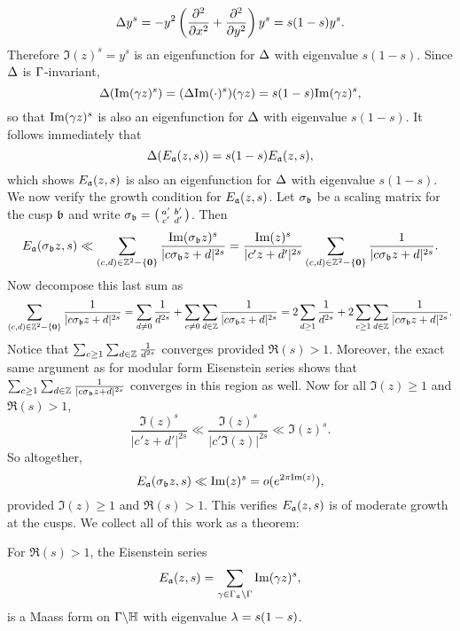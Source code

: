       \[
        \Delta y^{s} = -y^{2}\left(\frac{\partial^{2}}{\partial x^{2}}+\frac{\partial^{2}}{\partial y^{2}}\right)y^{s} = s(1-s)y^{s}.
      \]
      Therefore $\Im(z)^{s} = y^{s}$ is an eigenfunction for $\Delta$ with eigenvalue $s(1-s)$. Since $\Delta$ is $\Gamma$-invariant,
      \[
        \Delta(\mathrm{Im}(\gamma z)^{s}) = (\Delta\mathrm{Im}(\cdot)^{s})(\gamma z) = s(1-s)\mathrm{Im}(\gamma z)^{s},
      \]
      so that $\mathrm{Im}(\gamma z)^{s}$ is also an eigenfunction for $\Delta$ with eigenvalue $s(1-s)$. It follows immediately that
      \[
        \Delta(E_{\mathfrak{a}}(z,s)) = s(1-s)E_{\mathfrak{a}}(z,s),
      \]
      which shows $E_{\mathfrak{a}}(z,s)$ is also an eigenfunction for $\Delta$ with eigenvalue $s(1-s)$. We now verify the growth condition for $E_{\mathfrak{a}}(z,s)$. Let $\sigma_{\mathfrak{b}}$ be a scaling matrix for the cusp $\mathfrak{b}$ and write $\sigma_{\mathfrak{b}} = \begin{psmallmatrix} a' & b' \\ c' & d' \end{psmallmatrix}$. Then
      \[
        E_{\mathfrak{a}}(\sigma_{\mathfrak{b}}z,s) \ll \sum_{(c,d) \in \mathbb{Z}^{2}-\{\mathbf{0}\}}\frac{\mathrm{Im}(\sigma_{\mathfrak{b}}z)^{s}}{|c\sigma_{\mathfrak{b}}z+d|^{2s}} = \frac{\mathrm{Im}(z)^{s}}{|c'z+d'|^{2s}}\sum_{(c,d) \in \mathbb{Z}^{2}-\{\mathbf{0}\}}\frac{1}{|c\sigma_{\mathfrak{b}}z+d|^{2s}}.
      \]
      Now decompose this last sum as
      \[
        \sum_{(c,d) \in \mathbb{Z}^{2}-\{\mathbf{0}\}}\frac{1}{|c\sigma_{\mathfrak{b}}z+d|^{2s}} = \sum_{d \neq 0}\frac{1}{d^{2s}}+\sum_{c \neq 0}\sum_{d \in \mathbb{Z}}\frac{1}{|c\sigma_{\mathfrak{b}}z+d|^{2s}} = 2\sum_{d \ge 1}\frac{1}{d^{2s}}+2\sum_{c \ge 1}\sum_{d \in \mathbb{Z}}\frac{1}{|c\sigma_{\mathfrak{b}}z+d|^{2s}}.
      \]
      Notice that $\sum_{c \ge 1}\sum_{d \in \mathbb{Z}}\frac{1}{d^{2s}}$ converges provided $\Re(s) > 1$. Moreover, the exact same argument as for modular form Eisenstein series shows that $\sum_{c \ge 1}\sum_{d \in \mathbb{Z}}\frac{1}{|c\sigma_{\mathfrak{b}}z+d|^{2s}}$ converges in this region as well. Now for all $\Im(z) \ge 1$ and $\Re(s) > 1$,
      \[
        \frac{\Im(z)^{s}}{|c'z+d'|^{2s}} \ll \frac{\Im(z)^{s}}{|c'\Im(z)|^{2s}} \ll \Im(z)^{s}.
      \]
      So altogether,
      \[
        E_{\mathfrak{a}}(\sigma_{\mathfrak{b}}z,s) \ll \mathrm{Im}(z)^{s} = o(e^{2\pi\mathrm{Im}(z)}),
      \]
      provided $\Im(z) \ge 1$ and $\Re(s) > 1$. This verifies $E_{\mathfrak{a}}(z,s)$ is of moderate growth at the cusps. We collect all of this work as a theorem:

      \begin{theorem}
        For $\Re(s) > 1$, the Eisenstein series
        \[
          E_{\mathfrak{a}}(z,s) = \sum_{\gamma \in \Gamma_{\mathfrak{a}}\backslash\Gamma}\mathrm{Im}(\gamma z)^{s},
        \]
        is a Maass form on $\Gamma\backslash\mathbb{H}$ with eigenvalue $\lambda = s(1-s)$.
      \end{theorem}


